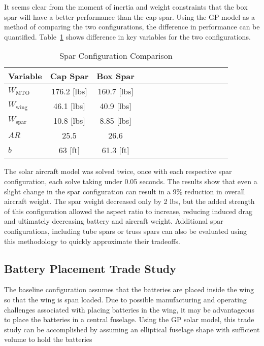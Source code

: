 \documentclass[]{aiaa-tc}%
\begin{document}
It seems clear from the moment of inertia and weight constraints that the box spar will have a better performance than the cap spar.  
Using the GP model as a method of comparing the two configurations, the difference in performance can be quantified. 
Table~\ref{t:spar} shows difference in key variables for the two configurations. 

\begin{longtable}{lccccccccccccc}
    \caption{Spar Configuration Comparison}\\
    \toprule
    \toprule
    \label{t:spar}
    Variable                & Cap Spar      & Box Spar      \\ \hline
    $W_{\mathrm{MTO}}$      & 176.2 [lbs]   &  160.7 [lbs]  \\
    $W_{\mathrm{wing}}$     & 46.1 [lbs]    & 40.9 [lbs]    \\
    $W_{\mathrm{spar}}$     & 10.8 [lbs]    & 8.85 [lbs]    \\
    $AR$                    & 25.5          & 26.6          \\
    $b$                     & 63 [ft]       &  61.3 [ft] \\
    \bottomrule
\end{longtable}

The solar aircraft model was solved twice, once with each respective spar configuration, each solve taking under 0.05 seconds.  
The results show that even a slight change in the spar configuration can result in a 9\% reduction in overall aircraft weight.  
The spar weight decreased only by 2 lbs, but the added strength of this configuration allowed the aspect ratio to increase, reducing induced drag and ultimately decreasing battery and aircraft weight.
Additional spar configurations, including tube spars or truss spars can also be evaluated using this methodology to quickly approximate their tradeoffs. 

\subsection{Battery Placement Trade Study}

The baseline configuration assumes that the batteries are placed inside the wing so that the wing is span loaded.  
Due to possible manufacturing and operating challenges associated with placing batteries in the wing, it may be advantageous to place the batteries in a central fuselage.  
Using the GP solar model, this trade study can be accomplished by assuming an elliptical fuselage shape with sufficient volume to hold the batteries
\end{document}
